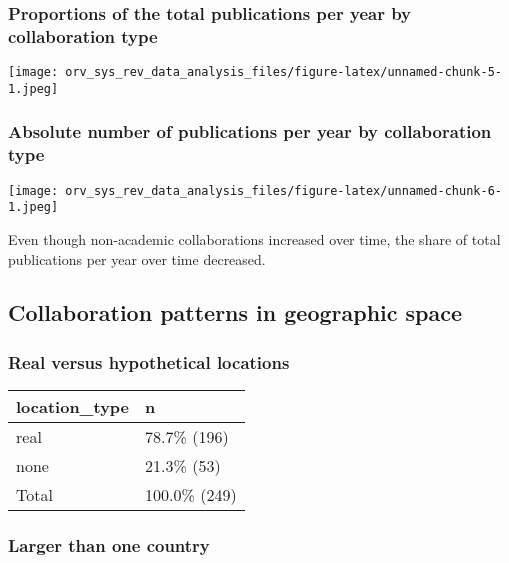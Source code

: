 \documentclass[
]{article}
\begin{document}
\hypertarget{proportions-of-the-total-publications-per-year-by-collaboration-type}{%
\subsubsection{Proportions of the total publications per year by
collaboration
type}\label{proportions-of-the-total-publications-per-year-by-collaboration-type}}

\texttt{[image: orv\_sys\_rev\_data\_analysis\_files/figure-latex/unnamed-chunk-5-1.jpeg]}

\hypertarget{absolute-number-of-publications-per-year-by-collaboration-type}{%
\subsubsection{Absolute number of publications per year by collaboration
type}\label{absolute-number-of-publications-per-year-by-collaboration-type}}

\texttt{[image: orv\_sys\_rev\_data\_analysis\_files/figure-latex/unnamed-chunk-6-1.jpeg]}

Even though non-academic collaborations increased over time, the share
of total publications per year over time decreased.

\hypertarget{collaboration-patterns-in-geographic-space}{%
\subsection{Collaboration patterns in geographic
space}\label{collaboration-patterns-in-geographic-space}}

\hypertarget{real-versus-hypothetical-locations}{%
\subsubsection{Real versus hypothetical
locations}\label{real-versus-hypothetical-locations}}

\begin{longtable}[]{@{}ll@{}}
\toprule
location\_type & n \\
\midrule
\endhead
real & 78.7\% (196) \\
none & 21.3\% (53) \\
Total & 100.0\% (249) \\
\bottomrule
\end{longtable}

\hypertarget{larger-than-one-country}{%
\subsubsection{Larger than one country}\label{larger-than-one-country}}
\end{document}
